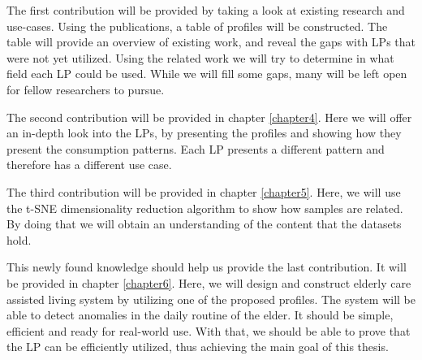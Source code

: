 The first contribution will be provided by taking a look at existing research and use-cases. 
Using the publications, a table of profiles will be constructed.
The table will provide an overview of existing work, and reveal the gaps with LPs that were not yet utilized.
Using the related work we will try to determine in what field each LP could be used. 
While we will fill some gaps, many will be left open for fellow researchers to pursue.  

The second contribution will be provided in chapter \ref{chapter4}.
Here we will offer an in-depth look into the LPs, by presenting the profiles and showing how they present the consumption patterns.
Each LP presents a different pattern and therefore has a different use case. 

The third contribution will be provided in chapter \ref{chapter5}.
Here, we will use the t-SNE dimensionality reduction algorithm to show how samples are related.
By doing that we will obtain an understanding of the content that the datasets hold.

This newly found knowledge should help us provide the last contribution.
It will be provided in chapter \ref{chapter6}.
Here, we will design and construct elderly care assisted living system by utilizing one of the proposed profiles.
The system will be able to detect anomalies in the daily routine of the elder.
It should be simple, efficient and ready for real-world use.
With that, we should be able to prove that the LP can be efficiently utilized,
thus achieving the main goal of this thesis.


